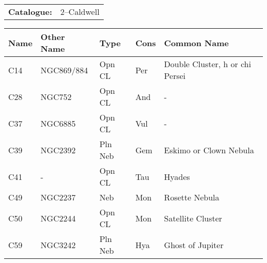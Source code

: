 \begin{tabular}{ p{0.9in} p{1.3in}}
{\bf Catalogue:} & 2--Caldwell \\ 
\end{tabular}
\centering 
\begin{longtable}{ p{0.7in}  p{1.0in}  p{0.6in}  p{0.9in}  p{4.0in} }
\hline 
{\bf Name} & {\bf Other Name} & {\bf Type} & {\bf Cons} & {\bf Common Name} \\ 
\hline 
C14 & NGC869/884 & Opn CL & Per & Double Cluster, h or chi Persei \\ 
C28 & NGC752 & Opn CL & And & - \\ 
C37 & NGC6885 & Opn CL & Vul & - \\ 
C39 & NGC2392 & Pln Neb & Gem & Eskimo or Clown Nebula \\ 
C41 & - & Opn CL & Tau & Hyades \\ 
C49 & NGC2237 & Neb & Mon & Rosette Nebula \\ 
C50 & NGC2244 & Opn CL & Mon & Satellite Cluster \\ 
C59 & NGC3242 & Pln Neb & Hya & Ghost of Jupiter \\ 
\hline 
\end{longtable} 
